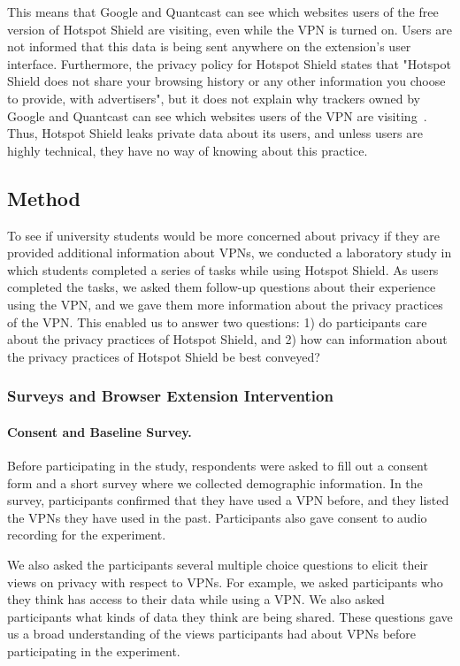 This means that Google and Quantcast can see which websites users of the free version of Hotspot Shield are visiting, even while the VPN is turned on. Users are not informed that this data is being sent anywhere on the extension's user interface. Furthermore, the privacy policy for Hotspot Shield states that "Hotspot Shield does not share your browsing history or any other information you choose to provide, with advertisers", but it does not explain why trackers owned by Google and Quantcast can see which websites users of the VPN are visiting~\cite{hotspot_privacy}. Thus, Hotspot Shield leaks private data about its users, and unless users are highly technical, they have no way of knowing about this practice.

\subsection{Method}\label{sec:experiment_method}
To see if university students would be more concerned about privacy if they are provided additional information about VPNs, we conducted a laboratory study in which students completed a series of tasks while using Hotspot Shield. As users completed the tasks, we asked them follow-up questions about their experience using the VPN, and we gave them more information about the privacy practices of the VPN. This enabled us to answer two questions: 1) do participants care about the privacy practices of Hotspot Shield, and 2) how can information about the privacy practices of Hotspot Shield be best conveyed?

\subsubsection{Surveys and Browser Extension Intervention}

\paragraph{Consent and Baseline Survey.}
Before participating in the study, respondents were asked to fill out a
consent form and a short survey where we collected demographic information.
In the survey, participants confirmed that they have used a VPN before, and
they listed the VPNs they have used in the past.  Participants also gave
consent to audio recording for the experiment.

We also asked the participants several multiple choice questions to elicit
their views on privacy with respect to VPNs.  For example, we asked
participants who they think has access to their data while using a VPN.  We
also asked participants what kinds of data they think are being shared.  These
questions gave us a broad understanding of the views participants had about
VPNs before participating in the experiment.

